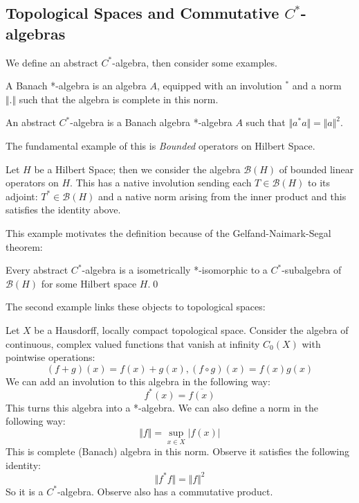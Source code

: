 \subsection{Topological Spaces and Commutative $C^{*}$-algebras}

We define an abstract $C^{*}$-algebra, then consider some examples.

\begin{definition}
A Banach *-algebra is an algebra $A$, equipped with an involution $^{*}$ and a norm $\Vert . \Vert$ such that the algebra is complete in this norm.
\end{definition}

\begin{definition}
An abstract $C^{*}$-algebra is a Banach algebra *-algebra $A$ such that $\Vert a^{*}a \Vert = \Vert a \Vert^{2}$.
\end{definition}

The fundamental example of this is \textit{Bounded} operators on Hilbert Space.

\begin{example}
Let $H$ be a Hilbert Space; then we consider the algebra $\mathcal{B}(H)$ of bounded linear operators on $H$. This has a native involution sending each $T \in \mathcal{B}(H)$ to its adjoint: $T^{*} \in \mathcal{B}(H)$ and a native norm arising from the inner product and this satisfies the identity above.
\end{example}

This example motivates the definition because of the Gelfand-Naimark-Segal theorem:

\begin{theorem}
Every abstract $C^{*}$-algebra is a isometrically *-isomorphic to a $C^{*}$-subalgebra of $\mathcal{B}(H)$ for some Hilbert space $H$.\qed
\end{theorem}

The second example links these objects to topological spaces:

\begin{example}
Let $X$ be a Hausdorff, locally compact topological space. Consider the algebra of continuous, complex valued functions that vanish at infinity $C_{0}(X)$ with pointwise operations:
\begin{equation*}
(f+g)(x)=f(x)+g(x), (f\circ g)(x)=f(x)g(x)
\end{equation*}
We can add an involution to this algebra in the following way:
\begin{equation*}
f^{*}(x)=\overline{f(x)}
\end{equation*}
This turns this algebra into a *-algebra. We can also define a norm in the following way:
\begin{equation*}
\Vert f \Vert = \sup_{x \in X} \vert f(x) \vert
\end{equation*}
This is complete (Banach) algebra in this norm. Observe it satisfies the following identity:
\begin{equation*}
\Vert f^{*}f \Vert = \Vert f \Vert^{2}
\end{equation*}
So it is a $C^{*}$-algebra. Observe also has a commutative product.
\end{example}

